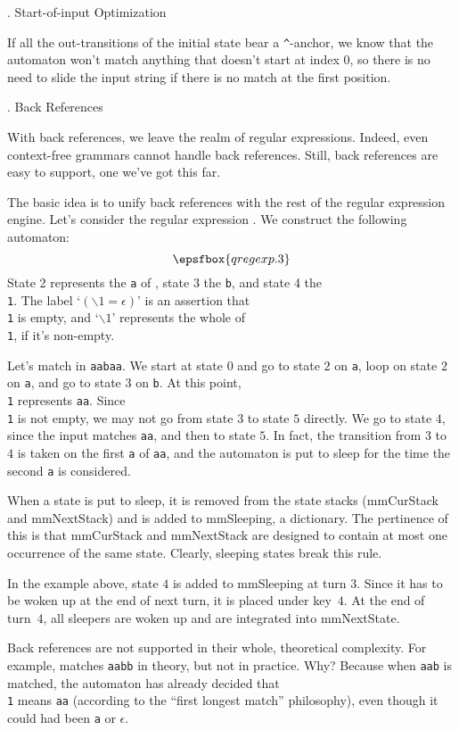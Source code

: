 . Start-of-input Optimization

If all the out-transitions of the initial state bear a {\tt\^}-anchor, we know that the automaton won't match anything that doesn't start at index 0, so there is no need to slide the input string if there is no match at the first position.

. Back References

With back references, we leave the realm of regular expressions.  Indeed, even context-free grammars cannot handle back references.  Still, back references are easy to support, one we've got this far.

The basic idea is to unify back references with the rest of the regular expression engine.  Let's consider the regular expression .  We construct the following automaton:  $$\epsfbox{qregexp.3}$$  State 2 represents the {\tt a} of , state 3 the {\tt b}, and state 4 the {\tt \\1}.  The label `$(\backslash1 = \epsilon)$' is an assertion that {\tt \\1} is empty, and `$\backslash1$' represents the whole of {\tt \\1}, if it's non-empty.

Let's match  in {\tt aabaa}.  We start at state $0$ and go to state $2$ on {\tt a}, loop on state $2$ on {\tt a}, and go to state $3$ on {\tt b}.  At this point, {\tt \\1} represents {\tt aa}.  Since {\tt \\1} is not empty, we may not go from state $3$ to state $5$ directly.  We go to state $4$, since the input matches {\tt aa}, and then to state $5$.  In fact, the transition from $3$ to $4$ is taken on the first {\tt a} of {\tt aa}, and the automaton is put to sleep for the time the second {\tt a} is considered.

When a state is put to sleep, it is removed from the state stacks ({\sf mmCurStack} and {\sf mmNextStack}) and is added to {\sf mmSleeping}, a dictionary.  The pertinence of this is that {\sf mmCurStack} and {\sf mmNextStack} are designed to contain at most one occurrence of the same state.  Clearly, sleeping states break this rule.

In the example above, state $4$ is added to {\sf mmSleeping} at turn $3$.  Since it has to be woken up at the end of next turn, it is placed under key~$4$.  At the end of turn~$4$, all sleepers are woken up and are integrated into {\sf mmNextState}.

Back references are not supported in their whole, theoretical complexity.  For example,  matches {\tt aabb} in theory, but not in practice.  Why?  Because when {\tt aab} is matched, the automaton has already decided that {\tt \\1} means {\tt aa} (according to the ``first longest match'' philosophy), even though it could had been {\tt a} or $\epsilon$.

\bye
